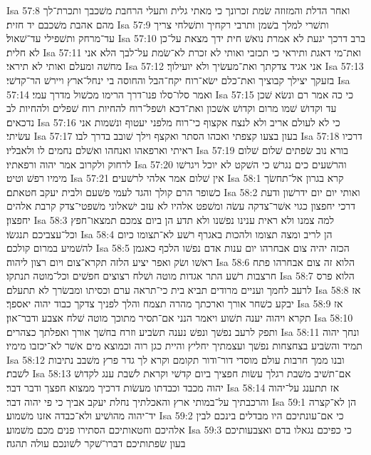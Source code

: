Isa 57:8  ואחר הדלת והמזוזה שׂמת זכרונך כי מאתי גלית ותעלי הרחבת משׁכבך ותכרת־לך מהם אהבת משׁכבם יד חזית׃
Isa 57:9  ותשׁרי למלך בשׁמן ותרבי רקחיך ותשׁלחי צריך עד־מרחק ותשׁפילי עד־שׁאול׃
Isa 57:10  ברב דרכך יגעת לא אמרת נואשׁ חית ידך מצאת על־כן לא חלית׃
Isa 57:11  ואת־מי דאגת ותיראי כי תכזבי ואותי לא זכרת לא־שׂמת על־לבך הלא אני מחשׁה ומעלם ואותי לא תיראי׃
Isa 57:12  אני אגיד צדקתך ואת־מעשׂיך ולא יועילוך׃
Isa 57:13  בזעקך יצילך קבוציך ואת־כלם ישׂא־רוח יקח־הבל והחוסה בי ינחל־ארץ ויירשׁ הר־קדשׁי׃
Isa 57:14  ואמר סלו־סלו פנו־דרך הרימו מכשׁול מדרך עמי׃
Isa 57:15  כי כה אמר רם ונשׂא שׁכן עד וקדושׁ שׁמו מרום וקדושׁ אשׁכון ואת־דכא ושׁפל־רוח להחיות רוח שׁפלים ולהחיות לב נדכאים׃
Isa 57:16  כי לא לעולם אריב ולא לנצח אקצוף כי־רוח מלפני יעטוף ונשׁמות אני עשׂיתי׃
Isa 57:17  בעון בצעו קצפתי ואכהו הסתר ואקצף וילך שׁובב בדרך לבו׃
Isa 57:18  דרכיו ראיתי וארפאהו ואנחהו ואשׁלם נחמים לו ולאבליו׃
Isa 57:19  בורא נוב שׂפתים שׁלום שׁלום לרחוק ולקרוב אמר יהוה ורפאתיו׃
Isa 57:20  והרשׁעים כים נגרשׁ כי השׁקט לא יוכל ויגרשׁו מימיו רפשׁ וטיט׃
Isa 57:21  אין שׁלום אמר אלהי לרשׁעים׃
Isa 58:1  קרא בגרון אל־תחשׂך כשׁופר הרם קולך והגד לעמי פשׁעם ולבית יעקב חטאתם׃
Isa 58:2  ואותי יום יום ידרשׁון ודעת דרכי יחפצון כגוי אשׁר־צדקה עשׂה ומשׁפט אלהיו לא עזב ישׁאלוני משׁפטי־צדק קרבת אלהים יחפצון׃
Isa 58:3  למה צמנו ולא ראית ענינו נפשׁנו ולא תדע הן ביום צמכם תמצאו־חפץ וכל־עצביכם תנגשׂו׃
Isa 58:4  הן לריב ומצה תצומו ולהכות באגרף רשׁע לא־תצומו כיום להשׁמיע במרום קולכם׃
Isa 58:5  הכזה יהיה צום אבחרהו יום ענות אדם נפשׁו הלכף כאגמן ראשׁו ושׂק ואפר יציע הלזה תקרא־צום ויום רצון ליהוה׃
Isa 58:6  הלוא זה צום אבחרהו פתח חרצבות רשׁע התר אגדות מוטה ושׁלח רצוצים חפשׁים וכל־מוטה תנתקו׃
Isa 58:7  הלוא פרס לרעב לחמך ועניים מרודים תביא בית כי־תראה ערם וכסיתו ומבשׂרך לא תתעלם׃
Isa 58:8  אז יבקע כשׁחר אורך וארכתך מהרה תצמח והלך לפניך צדקך כבוד יהוה יאספך׃
Isa 58:9  אז תקרא ויהוה יענה תשׁוע ויאמר הנני אם־תסיר מתוכך מוטה שׁלח אצבע ודבר־און׃
Isa 58:10  ותפק לרעב נפשׁך ונפשׁ נענה תשׂביע וזרח בחשׁך אורך ואפלתך כצהרים׃
Isa 58:11  ונחך יהוה תמיד והשׂביע בצחצחות נפשׁך ועצמתיך יחליץ והיית כגן רוה וכמוצא מים אשׁר לא־יכזבו מימיו׃
Isa 58:12  ובנו ממך חרבות עולם מוסדי דור־ודור תקומם וקרא לך גדר פרץ משׁבב נתיבות לשׁבת׃
Isa 58:13  אם־תשׁיב משׁבת רגלך עשׂות חפציך ביום קדשׁי וקראת לשׁבת ענג לקדושׁ יהוה מכבד וכבדתו מעשׂות דרכיך ממצוא חפצך ודבר דבר׃
Isa 58:14  אז תתענג על־יהוה והרכבתיך על־במותי ארץ והאכלתיך נחלת יעקב אביך כי פי יהוה דבר׃
Isa 59:1  הן לא־קצרה יד־יהוה מהושׁיע ולא־כבדה אזנו משׁמוע׃
Isa 59:2  כי אם־עונתיכם היו מבדלים בינכם לבין אלהיכם וחטאותיכם הסתירו פנים מכם משׁמוע׃
Isa 59:3  כי כפיכם נגאלו בדם ואצבעותיכם בעון שׂפתותיכם דברו־שׁקר לשׁונכם עולה תהגה׃
